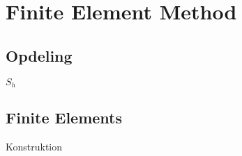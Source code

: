 
\section{Finite Element Method}
\subsection{Opdeling}
\begin{frame}{$S_h$}{}
\end{frame}

\subsection{Finite Elements}
\begin{frame}{Konstruktion}{}
\end{frame}